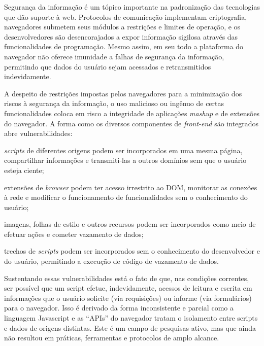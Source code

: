 Segurança da informação é um tópico importante na padronização das tecnologias que dão suporte à web. Protocolos de comunicação implementam criptografia, navegadores submetem seus módulos a restrições e limites de operação, e os desenvolvedores são desencorajados a expor informação sigilosa através das funcionalidades de programação. Mesmo assim, em seu todo a plataforma do navegador não oferece imunidade a falhas de segurança da informação, permitindo que dados do usuário sejam acessados e retransmitidos indevidamente.

A despeito de restrições impostas pelos navegadores para a minimização dos riscos à segurança da informação, o uso malicioso ou ingênuo de certas funcionalidades coloca em risco a integridade de aplicações \textit{mashup} e de extensões do navegador. A forma como os diversos componentes de \textit{front-end} são integrados abre vulnerabilidades:

\begin{alineas}
	\item \textit{scripts} de diferentes origens podem ser incorporados em uma mesma página, compartilhar informações e transmiti-las a outros domínios sem que o usuário esteja ciente;
	\item extensões de \textit{browser} podem ter acesso irrestrito ao DOM, monitorar as conexões à rede e modificar o funcionamento de funcionalidades sem o conhecimento do usuário;
	\item imagens, folhas de estilo e outros recursos podem ser incorporados como meio de efetuar ações e cometer vazamento de dados;
	\item trechos de \textit{scripts} podem ser incorporados sem o conhecimento do desenvolvedor e do usuário, permitindo a execução de código de vazamento de dados.
\end{alineas}

Sustentando essas vulnerabilidades está o fato de que, nas condições correntes, ser possível que um script efetue, indevidamente, acessos de leitura e escrita em informações que o usuário solicite (via requisições) ou informe (via formulários) para o navegador. Isso é derivado da forma inconsistente e parcial como a linguagem Javascript e as ``APIs'' do navegador tratam o isolamento entre scripts e dados de origens distintas. Este é um campo de pesquisas ativo, mas que ainda não resultou em práticas, ferramentas e protocolos de amplo alcance.




